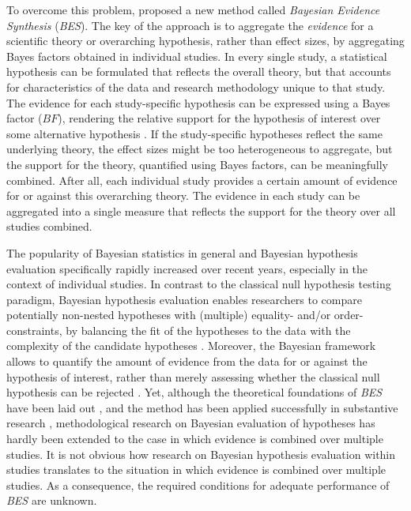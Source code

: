 \documentclass[
]{article}
\begin{document}
To overcome this problem, \citet{kuiper_combining_2013} proposed a new
method called \emph{Bayesian Evidence Synthesis} (\emph{BES}). The key
of the approach is to aggregate the \emph{evidence} for a scientific
theory or overarching hypothesis, rather than effect sizes, by
aggregating Bayes factors obtained in individual studies. In every
single study, a statistical hypothesis can be formulated that reflects
the overall theory, but that accounts for characteristics of the data
and research methodology unique to that study. The evidence for each
study-specific hypothesis can be expressed using a Bayes factor
(\(BF\)), rendering the relative support for the hypothesis of interest
over some alternative hypothesis
\citep{kass_raftery_bayes_factors_1995}. If the study-specific
hypotheses reflect the same underlying theory, the effect sizes might be
too heterogeneous to aggregate, but the support for the theory,
quantified using Bayes factors, can be meaningfully combined. After all,
each individual study provides a certain amount of evidence for or
against this overarching theory. The evidence in each study can be
aggregated into a single measure that reflects the support for the
theory over all studies combined.

The popularity of Bayesian statistics in general
\citep[e.g.,][]{lynch_bayesian_2019} and Bayesian hypothesis evaluation
specifically \citep{vandeschoot_systematic_2017} rapidly increased over
recent years, especially in the context of individual studies. In
contrast to the classical null hypothesis testing paradigm, Bayesian
hypothesis evaluation enables researchers to compare potentially
non-nested hypotheses with (multiple) equality- and/or
order-constraints, by balancing the fit of the hypotheses to the data
with the complexity of the candidate hypotheses
\citep{klugkist_inequality_2005, hoijtink2019tutorial}. Moreover, the
Bayesian framework allows to quantify the amount of evidence from the
data for or against the hypothesis of interest, rather than merely
assessing whether the classical null hypothesis can be rejected
\citep{Wagenmakers_bayesian_2018}. Yet, although the theoretical
foundations of \emph{BES} have been laid out
\citep{kuiper_combining_2013}, and the method has been applied
successfully in substantive research
\citep[e.g.,][]{kevenaar_bes_2021, zondervan_parental_2019, zondervan_robust_2020, volker_cooperation_2022},
methodological research on Bayesian evaluation of hypotheses has hardly
been extended to the case in which evidence is combined over multiple
studies. It is not obvious how research on Bayesian hypothesis
evaluation within studies translates to the situation in which evidence
is combined over multiple studies. As a consequence, the required
conditions for adequate performance of \emph{BES} are unknown.
\end{document}
